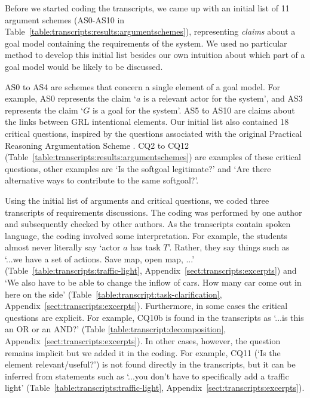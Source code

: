 Before we started coding the transcripts, we came up with an initial list of 11 argument schemes (AS0-AS10 in Table~\ref{table:transcripts:results:argumentschemes}), representing \emph{claims} about a goal model containing the requirements of the system. We used no particular method to develop this initial list besides our own intuition about which part of a goal model would be likely to be discussed.

AS0 to AS4 are schemes that concern a single element of a goal model. For example, AS0 represents the claim `$a$ is a relevant actor for the system', and AS3 represents the claim `$G$ is a goal for the system'. AS5 to AS10 are claims about the links between GRL intentional elements. Our initial list also contained 18 critical questions, inspired by the questions associated with the original Practical Reasoning Argumentation Scheme \cite{atkinson2007}. CQ2 to CQ12 (Table~\ref{table:transcripts:results:argumentschemes}) are examples of these critical questions, other examples are `Is the softgoal legitimate?' and `Are there alternative ways to contribute to the same softgoal?'.

Using the initial list of arguments and critical questions, we coded three transcripts of requirements discussions. The coding was performed by one author and subsequently checked by other authors. As the transcripts contain spoken language, the coding involved some interpretation. For example, the students almost never literally say `actor $a$ has task $T$'. Rather, they say things such as `...we have a set of actions. Save map, open map, ...' (Table~\ref{table:transcripts:traffic-light}, Appendix~\ref{sect:transcripts:excerpts}) and `We also have to be able to change the inflow of cars. How many car come out in here on the side' (Table~\ref{table:transcript:task-clarification}, Appendix~\ref{sect:transcripts:excerpts}). Furthermore, in some cases the critical questions are explicit. For example, CQ10b is found in the transcripts as `...is this an OR or an AND?' (Table \ref{table:transcript:decomposition}, Appendix~\ref{sect:transcripts:excerpts}). In other cases, however, the question remains implicit but we added it in the coding. For example, CQ11 (`Is the element relevant/useful?') is not found directly in the transcripts, but it can be inferred from statements such as `...you don't have to specifically add a traffic light' (Table~\ref{table:transcripts:traffic-light}, Appendix~\ref{sect:transcripts:excerpts}). 

